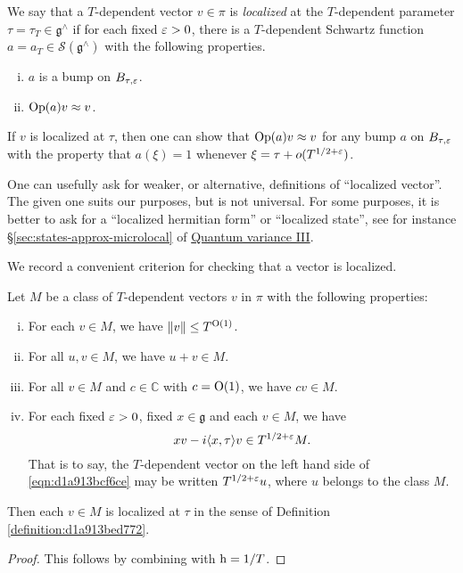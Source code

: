 \documentclass[reqno]{amsart} 
\numberwithin{equation}{section}
\numberwithin{theorem}{section}
\begin{document}
\begin{definition}\label{definition:d1a913bed772}
  We say that a $T$-dependent vector $v \in \pi$ is \emph{localized} at the $T$-dependent parameter $\tau = \tau_T \in \mathfrak{g}^\wedge$ if for each fixed $\varepsilon > 0$, there is a $T$-dependent Schwartz function $a = a_T \in \mathcal{S} (\mathfrak{g}^\wedge)$ with the following properties.
  \begin{enumerate}[(i)]
  \item $a$ is a bump on $B_{\tau,\varepsilon}$.
  \item $\operatorname{Op}(a) v \approx v$.
  \end{enumerate}
\end{definition}
\begin{remark}
  If $v$ is localized at $\tau$, then one can show that $\operatorname{Op}(a) v \approx v$ for any bump $a$ on $B_{\tau,\varepsilon}$ with the property that $a(\xi) = 1$ whenever $\xi = \tau + o(T^{1/2+\varepsilon})$.
\end{remark}
\begin{remark}
One can usefully ask for weaker, or alternative, definitions of ``localized vector''.  The given one suits our purposes, but is not universal.  For some purposes, it is better to ask for a ``localized hermitian form'' or ``localized state'', see for instance \S\ref{sec:states-approx-microlocal} of \href{var-quat-3-submitted.pdf}{Quantum variance III}.
\end{remark}

We record a convenient criterion for checking that a vector is localized.
\begin{theorem}\label{theorem:d1a913c8091b}
  Let $M$ be a class of $T$-dependent vectors $v$ in $\pi$ with the following properties:
  \begin{enumerate}[(i)]
  \item For each $v \in M$, we have $\lVert v \rVert \leq T^{\operatorname{O}(1)}$.
  \item For all $u, v \in M$, we have $u + v \in M$.
  \item For all $v \in M$ and $c \in \mathbb{C}$ with $c = \operatorname{O}(1)$, we have $c v \in M$.
  \item For each fixed $\varepsilon > 0$, fixed $x \in \mathfrak{g}$ and each $v \in M$, we have
    \begin{equation}\label{eqn:d1a913bcf6ce}
      x v - i \langle x, \tau  \rangle v \in T^{1/2+\varepsilon} M.
    \end{equation}
    That is to say, the $T$-dependent vector on the left hand side of \eqref{eqn:d1a913bcf6ce} may be written $T^{1/2+\varepsilon} u$, where $u$ belongs to the class $M$.
  \end{enumerate}
  Then each $v \in M$ is localized at $\tau$ in the sense of Definition \ref{definition:d1a913bed772}.
\end{theorem}
\begin{proof}
  This follows by combining \cite[Lem 14.5, Thm 14.12]{2021arXiv210915230N} with $\operatorname{h} = 1/T$.
\end{proof}
\end{document}
